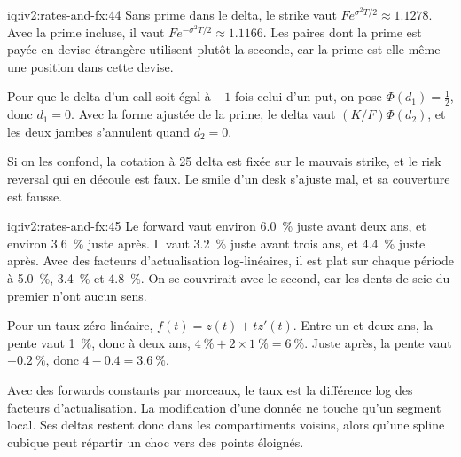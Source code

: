 \begin{solution}{iq:iv2:rates-and-fx:44}
Sans prime dans le delta, le strike vaut $Fe^{\sigma^2T/2} \approx 1.1278$. Avec la prime incluse, il vaut $Fe^{-\sigma^2T/2} \approx 1.1166$. Les paires dont la prime est payée en devise étrangère utilisent plutôt la seconde, car la prime est elle-même une position dans cette devise.

Pour que le delta d'un call soit égal à $-1$ fois celui d'un put, on pose $\Phi(d_1) = \tfrac12$, donc $d_1 = 0$. Avec la forme ajustée de la prime, le delta vaut $(K/F)\Phi(d_2)$, et les deux jambes s'annulent quand $d_2 = 0$.

Si on les confond, la cotation à 25 delta est fixée sur le mauvais strike, et le risk reversal qui en découle est faux. Le smile d'un desk s'ajuste mal, et sa couverture est fausse.

\end{solution}

\begin{solution}{iq:iv2:rates-and-fx:45}
Le forward vaut environ 6.0~\% juste avant deux ans, et environ 3.6~\% juste après. Il vaut 3.2~\% juste avant trois ans, et 4.4~\% juste après. Avec des facteurs d'actualisation log-linéaires, il est plat sur chaque période à 5.0~\%, 3.4~\% et 4.8~\%. On se couvrirait avec le second, car les dents de scie du premier n'ont aucun sens.

Pour un taux zéro linéaire, $f(t) = z(t) + tz'(t)$. Entre un et deux ans, la pente vaut 1~\%, donc à deux ans, $4~\% + 2 \times 1~\% = 6~\%$. Juste après, la pente vaut $-0.2~\%$, donc $4 - 0.4 = 3.6~\%$.

Avec des forwards constants par morceaux, le taux est la différence log des facteurs d'actualisation. La modification d'une donnée ne touche qu'un segment local. Ses deltas restent donc dans les compartiments voisins, alors qu'une spline cubique peut répartir un choc vers des points éloignés.

\end{solution}

